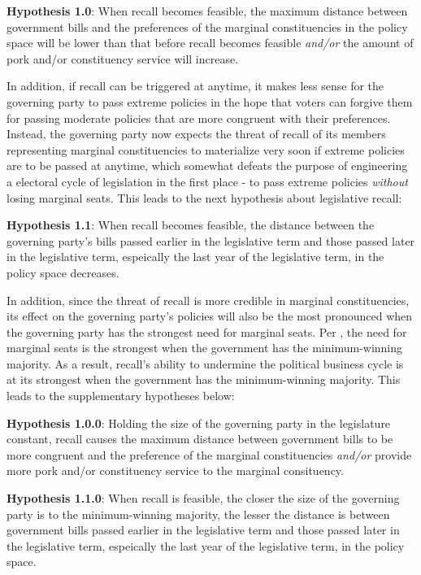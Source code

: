 \documentclass{article}
\begin{document}
		\textbf{Hypothesis 1.0}: When recall becomes feasible,
		the maximum distance between government bills
		and the preferences of the marginal constituencies in the policy space will be lower
		than that before recall becomes feasible
		\textit{and/or}
		the amount of pork and/or constituency service will increase.
		
		In addition,
		if recall can be triggered at anytime,
		it makes less sense
		for the governing party
		to pass extreme policies
		in the hope that
		voters can forgive them for passing moderate policies
		that are more congruent with their preferences.
		Instead,
		the governing party now expects the threat of recall 
		of its members representing marginal constituencies
		to materialize very soon if extreme policies are to be passed
		at anytime,
		which somewhat defeats the purpose of engineering a electoral cycle of legislation in the first place -
		to pass extreme policies \textit{without} losing marginal seats.
		This leads to the next hypothesis about legislative recall:
		
		\textbf{Hypothesis 1.1}: When recall becomes feasible,
		the distance between the governing party's bills passed earlier in the legislative term
		and those passed later in the legislative term,
		espeically the last year of the legislative term,
		in the policy space decreases.
		
		
		In addition,
		since
		the threat of recall is more credible in marginal constituencies,
		its effect on the governing party's policies
		will also be the most pronounced when the governing party
		has the strongest need for marginal seats.
		Per
		\citeauthor{stroblElectoralCyclesGovernment2021}
		\autocite*{stroblElectoralCyclesGovernment2021},
		the need for marginal seats is the strongest
		when the government has the minimum-winning majority.
		As a result, recall's ability to undermine the political business cycle
		is at its strongest when the government has the minimum-winning majority.
		This leads to the supplementary hypotheses below:
		
		\textbf{Hypothesis 1.0.0}: 
		Holding the size of the governing party in the legislature constant,
		recall causes
		the maximum distance between government bills to be more congruent
		and the preference of the marginal constituencies
		\textit{and/or}
		provide
		more pork and/or constituency service to the marginal consituency.
		
		\textbf{Hypothesis 1.1.0}: When recall is feasible,
		the closer the size of the governing party is to the minimum-winning majority,
		the lesser the distance is between government bills passed earlier in the legislative term
		and those passed later in the legislative term,
		espeically the last year of the legislative term,
		in the policy space.
		
\end{document}
